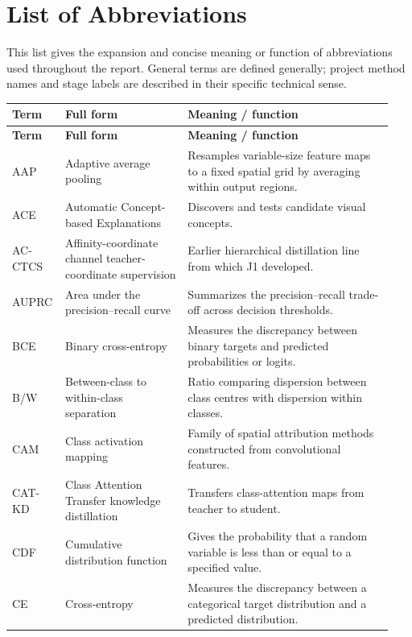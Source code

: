 \section*{List of Abbreviations}

This list gives the expansion and concise meaning or function of abbreviations
used throughout the report. General terms are defined generally; project
method names and stage labels are described in their specific technical sense.

\small
\begin{longtable}{@{}L{0.11\linewidth}L{0.31\linewidth}L{0.52\linewidth}@{}}
\toprule
\textbf{Term} & \textbf{Full form} & \textbf{Meaning / function}\\
\midrule
\endfirsthead
\toprule
\textbf{Term} & \textbf{Full form} & \textbf{Meaning / function}\\
\midrule
\endhead
AAP & Adaptive average pooling & Resamples variable-size feature maps to a fixed spatial grid by averaging within output regions.\\ \midrule
ACE & Automatic Concept-based Explanations & Discovers and tests candidate visual concepts.\\ \midrule
AC-CTCS & Affinity-coordinate channel teacher-coordinate supervision & Earlier hierarchical distillation line from which J1 developed.\\ \midrule
AUPRC & Area under the precision--recall curve & Summarizes the precision--recall trade-off across decision thresholds.\\ \midrule
BCE & Binary cross-entropy & Measures the discrepancy between binary targets and predicted probabilities or logits.\\ \midrule
B/W & Between-class to within-class separation & Ratio comparing dispersion between class centres with dispersion within classes.\\ \midrule
CAM & Class activation mapping & Family of spatial attribution methods constructed from convolutional features.\\ \midrule
CAT-KD & Class Attention Transfer knowledge distillation & Transfers class-attention maps from teacher to student.\\ \midrule
CDF & Cumulative distribution function & Gives the probability that a random variable is less than or equal to a specified value.\\ \midrule
CE & Cross-entropy & Measures the discrepancy between a categorical target distribution and a predicted distribution.\\ \midrule

\end{longtable}
